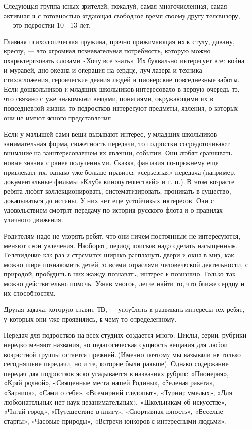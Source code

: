 \documentclass[12pt, a4paper, openany]{book}
\begin{document}
Следующая группа юных зрителей, пожалуй, самая многочисленная, самая активная и с готовностью отдающая свободное время своему другу-телевизору, — это подростки 10—13 лет. 

Главная психологическая пружина, прочно прижимающая их к стулу, дивану, креслу, — это огромная познавательная потребность, которую можно охарактеризовать словами «Хочу все знать». Их буквально интересует все: война и муравей, дно океана и операция на сердце, луч лазера и техника стихосложения, героические деяния людей и пионерские повседневные заботы. Если дошкольников и младших школьников интересовало в первую очередь то, что связано с уже знакомыми вещами, понятиями, окружающими их в повседневной жизни, то подростков интересуют предметы, явления, о которых они не имеют ясного представления. 

Если у малышей сами вещи вызывают интерес, у младших школьников — занимательная форма, сюжетность передачи, то подростки сосредоточивают внимание на заинтересовавшем их явлении, событии. Они любят сравнивать новые знания с ранее полученными. Сказка, фантазия по-прежнему еще привлекает их, однако уже больше нравится «серьезная» передача (например, документальные фильмы «Клуба кинопутешествий» и т. п.). В этом возрасте ребята любят коллекционировать, систематизировать, проникать в существо, докапываться до истины. У них нет еще устойчивых интересов. Они с удовольствием смотрят передачу по истории русского флота и о правилах уличного движения. 

Родителям надо не укорять ребят, что они ничем постоянным не интересуются, меняют свои увлечения. Наоборот, период поисков надо сделать насыщенным. Телевидение как раз и стремится широко распахнуть двери и окна в мир, как можно шире познакомить детей со всеми отраслями человеческой деятельности, с природой, пробудить в них жажду познавать, интерес к познанию. Только так можно действительно помочь. Узнав многое, легче найти то, что ближе сердцу и их способностям. 

Другая задача, которую ставит ТВ, — углублять и развивать интересы тех ребят, у которых они уже проявились, к чему-то определенному. 

Передач для подростков на всех студиях создается много. Циклы, серии, рубрики нередко меняют названия, но педагогическая сущность вещания для любой возрастной группы остается прежней. (Именно поэтому мы называли не только сегодняшние передачи, но и те, которые были раньше). Однако содержание передач для подростков ясно угадывается в названиях рубрик: «Пионерия», «Край родной», «Священные места нашей Родины», «Зеленая ракета», «Зарница», «Сами о себе», «Всемирный следопыт», «Турнир умелых», «Для любознательных нет наук незанимательных», «Школьникам об искусстве», «Читай-город», «Путешествие в книгу», «Спортивная юность», «Веселые старты», «Часовые природы», «Встречи юнкоров с интересными людьми». 
\end{document}
